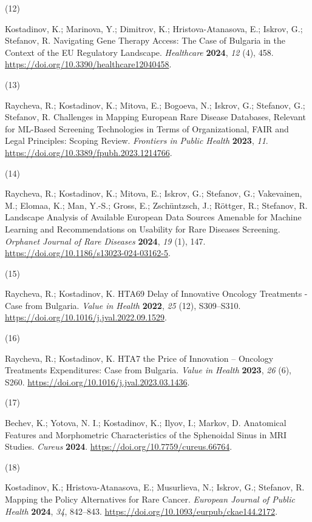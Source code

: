 \documentclass[
  12pt,
  letterpaper,
  DIV=11,
  numbers=noendperiod]{scrartcl}
\newlength{\cslhangindent}
\newlength{\csllabelwidth}
\newenvironment{CSLReferences}[2] %
 {\begin{list}{}{%
  \setlength{\itemindent}{0pt}
  \setlength{\leftmargin}{0pt}
  \setlength{\parsep}{0pt}
  \ifodd #1
   \setlength{\leftmargin}{\cslhangindent}
   \setlength{\itemindent}{-1\cslhangindent}
  \fi
  \setlength{\itemsep}{#2\baselineskip}}}
 {\end{list}}
\newcommand{\CSLLeftMargin}[1]{\parbox[t]{\csllabelwidth}{\strut#1\strut}}
\newcommand{\CSLRightInline}[1]{\parbox[t]{\linewidth - \csllabelwidth}{\strut#1\strut}}
\begin{document}
\begin{CSLReferences}{0}{0}
\CSLLeftMargin{(12) }%
\CSLRightInline{Kostadinov, K.; Marinova, Y.; Dimitrov, K.;
Hristova-Atanasova, E.; Iskrov, G.; Stefanov, R. Navigating Gene Therapy
Access: The Case of Bulgaria in the Context of the EU Regulatory
Landscape. \emph{Healthcare} \textbf{2024}, \emph{12} (4), 458.
\url{https://doi.org/10.3390/healthcare12040458}.}

\CSLLeftMargin{(13) }%
\CSLRightInline{Raycheva, R.; Kostadinov, K.; Mitova, E.; Bogoeva, N.;
Iskrov, G.; Stefanov, G.; Stefanov, R. Challenges in Mapping European
Rare Disease Databases, Relevant for ML-Based Screening Technologies in
Terms of Organizational, FAIR and Legal Principles: Scoping Review.
\emph{Frontiers in Public Health} \textbf{2023}, \emph{11}.
\url{https://doi.org/10.3389/fpubh.2023.1214766}.}

\CSLLeftMargin{(14) }%
\CSLRightInline{Raycheva, R.; Kostadinov, K.; Mitova, E.; Iskrov, G.;
Stefanov, G.; Vakevainen, M.; Elomaa, K.; Man, Y.-S.; Gross, E.;
Zschüntzsch, J.; Röttger, R.; Stefanov, R. Landscape Analysis of
Available European Data Sources Amenable for Machine Learning and
Recommendations on Usability for Rare Diseases Screening. \emph{Orphanet
Journal of Rare Diseases} \textbf{2024}, \emph{19} (1), 147.
\url{https://doi.org/10.1186/s13023-024-03162-5}.}

\CSLLeftMargin{(15) }%
\CSLRightInline{Raycheva, R.; Kostadinov, K. HTA69 Delay of Innovative
Oncology Treatments - Case from Bulgaria. \emph{Value in Health}
\textbf{2022}, \emph{25} (12), S309--S310.
\url{https://doi.org/10.1016/j.jval.2022.09.1529}.}

\CSLLeftMargin{(16) }%
\CSLRightInline{Raycheva, R.; Kostadinov, K. HTA7 the Price of
Innovation -- Oncology Treatments Expenditures: Case from Bulgaria.
\emph{Value in Health} \textbf{2023}, \emph{26} (6), S260.
\url{https://doi.org/10.1016/j.jval.2023.03.1436}.}

\CSLLeftMargin{(17) }%
\CSLRightInline{Bechev, K.; Yotova, N. I.; Kostadinov, K.; Ilyov, I.;
Markov, D. Anatomical Features and Morphometric Characteristics of the
Sphenoidal Sinus in MRI Studies. \emph{Cureus} \textbf{2024}.
\url{https://doi.org/10.7759/cureus.66764}.}

\CSLLeftMargin{(18) }%
\CSLRightInline{Kostadinov, K.; Hristova-Atanasova, E.; Musurlieva, N.;
Iskrov, G.; Stefanov, R. Mapping the Policy Alternatives for Rare
Cancer. \emph{European Journal of Public Health} \textbf{2024},
\emph{34}, 842--843. \url{https://doi.org/10.1093/eurpub/ckae144.2172}.}


\end{CSLReferences}
\end{document}
